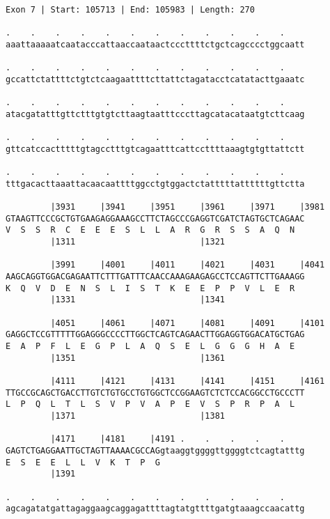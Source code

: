\documentclass{article}
\begin{document}
\begin{Verbatim}[fontfamily=courier]
Exon 7 | Start: 105713 | End: 105983 | Length: 270

.    .    .    .    .    .    .    .    .    .    .    .    
aaattaaaaatcaatacccattaaccaataactcccttttctgctcagcccctggcaatt

.    .    .    .    .    .    .    .    .    .    .    .    
gccattctattttctgtctcaagaattttcttattctagatacctcatatacttgaaatc

.    .    .    .    .    .    .    .    .    .    .    .    
atacgatatttgttctttgtgtcttaagtaatttcccttagcatacataatgtcttcaag

.    .    .    .    .    .    .    .    .    .    .    .    
gttcatccactttttgtagcctttgtcagaatttcattccttttaaagtgtgttattctt

.    .    .    .    .    .    .    .    .    .    .    .    
tttgacacttaaattacaacaattttggcctgtggactctatttttattttttgttctta

         |3931     |3941     |3951     |3961     |3971     |3981
GTAAGTTCCCGCTGTGAAGAGGAAAGCCTTCTAGCCCGAGGTCGATCTAGTGCTCAGAAC
V  S  S  R  C  E  E  E  S  L  L  A  R  G  R  S  S  A  Q  N  
         |1311                         |1321                

         |3991     |4001     |4011     |4021     |4031     |4041
AAGCAGGTGGACGAGAATTCTTTGATTTCAACCAAAGAAGAGCCTCCAGTTCTTGAAAGG
K  Q  V  D  E  N  S  L  I  S  T  K  E  E  P  P  V  L  E  R  
         |1331                         |1341                

         |4051     |4061     |4071     |4081     |4091     |4101
GAGGCTCCGTTTTTGGAGGGCCCCTTGGCTCAGTCAGAACTTGGAGGTGGACATGCTGAG
E  A  P  F  L  E  G  P  L  A  Q  S  E  L  G  G  G  H  A  E  
         |1351                         |1361                

         |4111     |4121     |4131     |4141     |4151     |4161
TTGCCGCAGCTGACCTTGTCTGTGCCTGTGGCTCCGGAAGTCTCTCCACGGCCTGCCCTT
L  P  Q  L  T  L  S  V  P  V  A  P  E  V  S  P  R  P  A  L  
         |1371                         |1381                

         |4171     |4181     |4191 .    .    .    .    .    
GAGTCTGAGGAATTGCTAGTTAAAACGCCAGgtaaggtggggttggggtctcagtatttg
E  S  E  E  L  L  V  K  T  P  G                             
         |1391                                              

.    .    .    .    .    .    .    .    .    .    .    .    
agcagatatgattagaggaagcaggagattttagtatgttttgatgtaaagccaacattg

\end{Verbatim}
\end{document}
